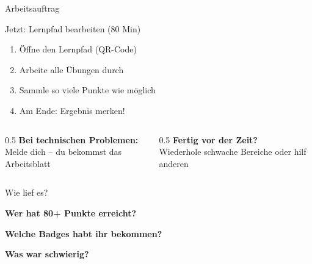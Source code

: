 \documentclass[aspectratio=169,11pt]{beamer}
\begin{document}
\begin{frame}{Arbeitsauftrag}

\begin{block}{Jetzt: Lernpfad bearbeiten (80 Min)}
\begin{enumerate}
    \item Öffne den Lernpfad (QR-Code)
    \item Arbeite alle Übungen durch
    \item Sammle so viele Punkte wie möglich
    \item Am Ende: Ergebnis merken!
\end{enumerate}
\end{block}

\vspace{5mm}

\begin{columns}
\begin{column}{0.5\textwidth}
\textbf{Bei technischen Problemen:}\\
Melde dich -- du bekommst das Arbeitsblatt
\end{column}

\begin{column}{0.5\textwidth}
\textbf{Fertig vor der Zeit?}\\
Wiederhole schwache Bereiche oder hilf anderen
\end{column}
\end{columns}

\end{frame}


\begin{frame}{Wie lief es?}

\begin{center}

\textbf{Wer hat 80+ Punkte erreicht?}

\vspace{10mm}

\textbf{Welche Badges habt ihr bekommen?}

\vspace{10mm}

\textbf{Was war schwierig?}

\end{center}

\end{frame}
\end{document}
